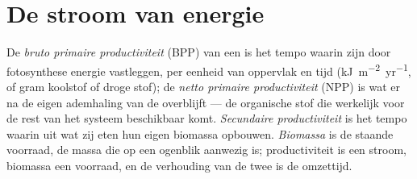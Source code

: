 \section{De stroom van energie}

\begin{definition}[Productiviteit]\label{def:b1:ecosystem-organization:productivity}
De \emph{bruto primaire productiviteit} (BPP) van een  is het
tempo waarin zijn  door fotosynthese energie vastleggen, per
eenheid van oppervlak en tijd (\unit{kJ.m^{-2}.yr^{-1}}, of gram koolstof of
droge stof); de \emph{netto primaire productiviteit} (NPP) is wat er na de
eigen ademhaling van de  overblijft --- de organische stof die
werkelijk voor de rest van het systeem beschikbaar komt. \emph{Secundaire
productiviteit} is het tempo waarin  uit wat zij eten hun eigen
biomassa opbouwen. \emph{Biomassa} is de staande voorraad, de massa die op
een ogenblik aanwezig is; productiviteit is een stroom, biomassa een
voorraad, en de verhouding van de twee is de omzettijd.
\end{definition}

